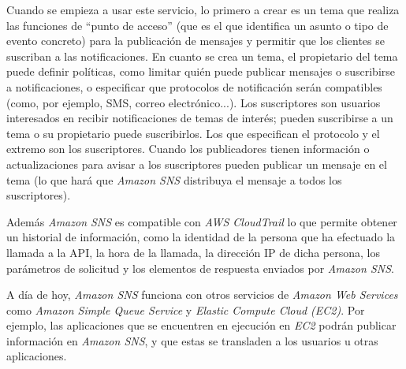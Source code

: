 \documentclass{article}
\begin{document}
	Cuando se empieza a usar este servicio, lo primero a crear es un tema que realiza las funciones de ``punto de acceso'' (que es el que identifica un asunto o tipo de evento concreto) para la publicación de mensajes y permitir que los clientes se suscriban a las notificaciones. En cuanto se crea un tema, el propietario del tema puede definir políticas, como limitar quién puede publicar mensajes o suscribirse a notificaciones, o especificar que protocolos de notificación serán compatibles (como, por ejemplo, SMS, correo electrónico...). Los suscriptores son usuarios interesados en recibir notificaciones de temas de interés; pueden suscribirse a un tema o su propietario puede suscribirlos. Los que especifican el protocolo y el extremo son los suscriptores. Cuando los publicadores tienen información o actualizaciones para avisar a los suscriptores pueden publicar un mensaje en el tema (lo que hará que \emph{Amazon SNS} distribuya el mensaje a todos los suscriptores).
	
	Además \emph{Amazon SNS} es compatible con \emph{AWS CloudTrail}\cite{CloudTrail} lo que permite obtener un historial de información, como la identidad de la persona que ha efectuado la llamada a la API, la hora de la llamada, la dirección IP de dicha persona, los parámetros de solicitud y los elementos de respuesta enviados por \emph{Amazon SNS}.
	
	A día de hoy, \emph{Amazon SNS} funciona con otros servicios de \emph{Amazon Web Services} como \emph{Amazon Simple Queue Service} y \emph{Elastic Compute Cloud (EC2)}\cite{EC2}. Por ejemplo, las aplicaciones que se encuentren en ejecución en \emph{EC2} podrán publicar información en \emph{Amazon SNS}, y que estas se transladen a los usuarios u otras aplicaciones.
\end{document}
